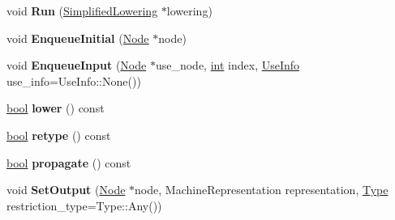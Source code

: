 \begin{DoxyCompactItemize}
void {\bfseries Run} (\mbox{\hyperlink{classv8_1_1internal_1_1compiler_1_1SimplifiedLowering}{Simplified\+Lowering}} $\ast$lowering)
\item 
\mbox{\label{classv8_1_1internal_1_1compiler_1_1RepresentationSelector_a13b6ed923717c0fea01aa1ddc6cee062}} 
void {\bfseries Enqueue\+Initial} (\mbox{\hyperlink{classv8_1_1internal_1_1compiler_1_1Node}{Node}} $\ast$node)
\item 
\mbox{\label{classv8_1_1internal_1_1compiler_1_1RepresentationSelector_aa0864b9a1c7ac1ac13d37cd493309967}} 
void {\bfseries Enqueue\+Input} (\mbox{\hyperlink{classv8_1_1internal_1_1compiler_1_1Node}{Node}} $\ast$use\+\_\+node, \mbox{\hyperlink{classint}{int}} index, \mbox{\hyperlink{classv8_1_1internal_1_1compiler_1_1UseInfo}{Use\+Info}} use\+\_\+info=Use\+Info\+::\+None())
\item 
\mbox{\label{classv8_1_1internal_1_1compiler_1_1RepresentationSelector_a8256c9e0e716e4ca6c84c06e3629d579}} 
\mbox{\hyperlink{classbool}{bool}} {\bfseries lower} () const
\item 
\mbox{\label{classv8_1_1internal_1_1compiler_1_1RepresentationSelector_a9de8c4a7b1fb389ce813e1d0d9e723f1}} 
\mbox{\hyperlink{classbool}{bool}} {\bfseries retype} () const
\item 
\mbox{\label{classv8_1_1internal_1_1compiler_1_1RepresentationSelector_a45a97cee398c565ec856770ab95e0d23}} 
\mbox{\hyperlink{classbool}{bool}} {\bfseries propagate} () const
\item 
\mbox{\label{classv8_1_1internal_1_1compiler_1_1RepresentationSelector_a39661cc41d6d8603e43d804898ab3ab8}} 
void {\bfseries Set\+Output} (\mbox{\hyperlink{classv8_1_1internal_1_1compiler_1_1Node}{Node}} $\ast$node, Machine\+Representation representation, \mbox{\hyperlink{classv8_1_1internal_1_1compiler_1_1Type}{Type}} restriction\+\_\+type=Type\+::\+Any())
\item 
\mbox{\label{classv8_1_1internal_1_1compiler_1_1RepresentationSelector_a47738ac46c1ff96084328b52a48fb9c4}} 

\end{DoxyCompactItemize}
